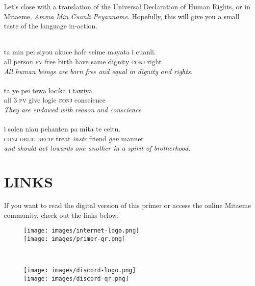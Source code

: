 \documentclass[a4paper]{article}
\begin{document}
Let's close with a translation of the Universal Declaration of Human Rights, or in Mitaeme, \textit{Amma Min Cuanli Peyanname}.
Hopefully, this will give you a small taste of the language in-action.\\
\\
\hspace*{1cm}%
\begin{minipage}{.8\textwidth}%
ta min pei siyou akuce hafe seime mayata i cuanli.\\
all person \textsc{pv} free birth have same dignity \textsc{conj} right\\
\textit{All human beings are born free and equal in dignity and rights.}\\
\\
ta ye pei tewa locika i tawiya\\
all \textsc{3 pv} give logic \textsc{conj} conscience\\
\textit{They are endowed with reason and conscience}\\
\\
i solen niau pehanten pa mita te ceitu.\\
\textsc{conj oblig recip} treat \textit{instr} friend \textit{gen} manner\\
\textit{and should act towards one another in a spirit of brotherhood.}
\end{minipage}%
\pagebreak
\section{LINKS}

If you want to read the digital version of this primer or access the online Mitaeme community, check
out the links below:
\\
\begin{figure}[h]
\centering
\texttt{[image: images/internet-logo.png]}
\\
\texttt{[image: images/primer-qr.png]}
\end{figure}
\\
\begin{figure}[h]
\centering
\texttt{[image: images/discord-logo.png]}
\\
\texttt{[image: images/discord-qr.png]}
\end{figure}
\end{document}
